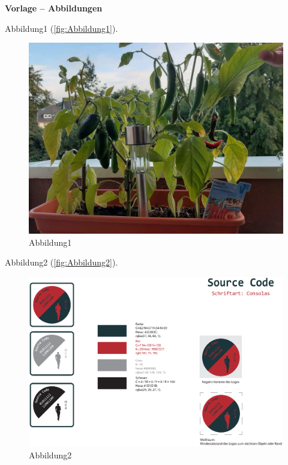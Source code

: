 \textbf{Vorlage -- Abbildungen}

Abbildung1 (\autoref{fig:Abbildung1}).
%
\begin{figure}[!hb]%
	\centering
	\includegraphics[width=.60\textwidth]{images/Chili-1.pdf}%
	\caption{Abbildung1}\label{fig:Abbildung1}%
\end{figure}

Abbildung2 (\autoref{fig:Abbildung2}).
%
\begin{figure}[!hb]%
	\centering
	\includegraphics[width=.95\textwidth]{images/Logo-Details.eps}%
	\caption{Abbildung2}\label{fig:Abbildung2}%
\end{figure}


